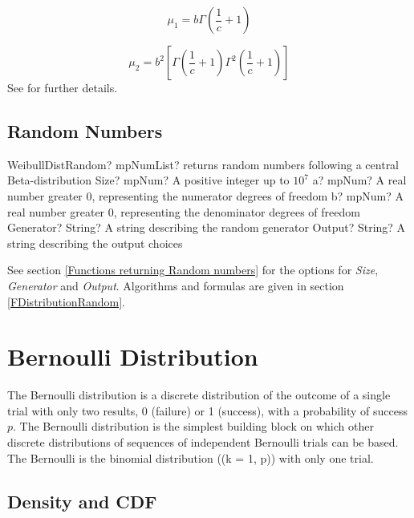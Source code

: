 \begin{equation} 
	\mu_1 = b \Gamma\left(\frac{1}{c}+1 \right) 
\end{equation}

\begin{equation} 
	\mu_2 = b^2 \left[ \Gamma\left(\frac{1}{c}+1\right) \Gamma^2\left(\frac{1}{c}+1\right)  \right]
\end{equation}
See \cite{Rinne_book_2008} for further details.

\subsection{Random Numbers}

\begin{mpFunctionsExtract}
	\mpFunctionFive
	{WeibullDistRandom? mpNumList? returns random numbers following a central Beta-distribution}
	{Size? mpNum? A positive integer up to $10^7$}
	{a? mpNum? A real number greater 0, representing the numerator  degrees of freedom}
	{b? mpNum? A real number greater 0, representing the denominator degrees of freedom}
	{Generator? String? A string describing the random generator}
	{Output? String? A string describing the output choices}
\end{mpFunctionsExtract}

\vspace{0.3cm}

See section \ref{Functions returning Random numbers} for the options for  {\itshape\sffamily Size},  {\itshape\sffamily Generator} and {\itshape\sffamily Output}. Algorithms and formulas are given in section \ref{FDistributionRandom}.





\section{Bernoulli Distribution}

The Bernoulli distribution is a discrete distribution of the outcome of a single trial with only two results, 0 (failure) or 1 (success), with a probability of success $p$. The Bernoulli distribution is the simplest building block on which other discrete distributions of sequences of independent Bernoulli trials can be based. The Bernoulli is the binomial distribution ((k = 1, p)) with only one trial.



\subsection{Density and CDF}

